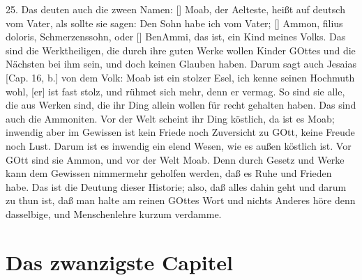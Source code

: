 25. Das deuten auch die zween Namen: [] Moab, der Aelteste, heißt auf deutsch vom Vater, als sollte sie sagen: Den Sohn habe ich vom Vater; [] Ammon, filius doloris, Schmerzenssohn, oder [] BenAmmi, das ist, ein Kind meines Volks. Das sind die Werktheiligen, die durch ihre guten Werke wollen Kinder GOttes und die Nächsten bei ihm sein, und doch keinen Glauben haben. Darum sagt auch Jesaias [Cap. 16, b.] von dem Volk: Moab ist ein stolzer Esel, ich kenne seinen Hochmuth wohl, [er] ist fast stolz, und rühmet sich mehr, denn er vermag. So sind sie alle, die aus Werken sind, die ihr Ding allein wollen für recht gehalten haben. Das sind auch die Ammoniten. Vor der Welt scheint ihr Ding köstlich, da ist es Moab; inwendig aber im Gewissen ist kein Friede noch Zuversicht zu GOtt, keine Freude noch Lust. Darum ist es inwendig ein elend Wesen, wie es außen köstlich ist. Vor GOtt sind sie Ammon, und vor der Welt Moab. Denn durch Gesetz und Werke kann dem Gewissen nimmermehr geholfen werden, daß es Ruhe und Frieden habe. Das ist die Deutung dieser Historie; also, daß alles dahin geht und darum zu thun ist, daß man halte am reinen GOttes Wort und nichts Anderes höre denn dasselbige, und Menschenlehre kurzum verdamme.

\section{Das zwanzigste Capitel}

